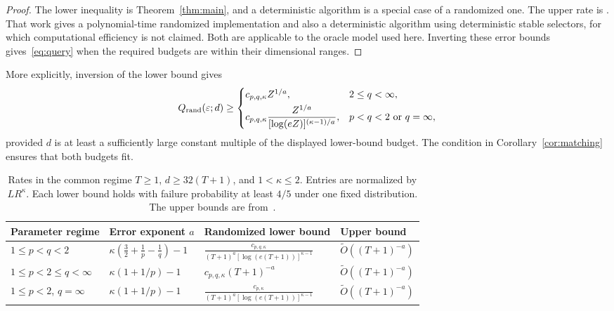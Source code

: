 \documentclass[11pt,a4paper]{article}
\theoremstyle{definition}
\theoremstyle{remark}
\newcommand{\eps}{\varepsilon}
\begin{document}
\begin{proof}
The lower inequality is Theorem~\ref{thm:main}, and a deterministic algorithm
is a special case of a randomized one. The upper rate is
\cite[Theorem 1 and the discussion on p.~3]{MBGM26}. That work gives a
polynomial-time randomized implementation and also a deterministic algorithm
using deterministic stable selectors, for which computational efficiency is
not claimed. Both are applicable to the oracle model used here.
Inverting these error bounds gives~\eqref{eq:query} when the required budgets
are within their dimensional ranges.
\end{proof}

More explicitly, inversion of the lower bound gives
\begin{equation}\label{eq:query-lower}
Q_{\rm rand}(\eps;d)\ge
\begin{cases}
 c_{p,q,\kappa}Z^{1/a},&2\le q<\infty,\\[3pt]
 \displaystyle c_{p,q,\kappa}
 \frac{Z^{1/a}}{[\log(eZ)]^{(\kappa-1)/a}},
 &p<q<2\ \text{or}\ q=\infty,
\end{cases}
\end{equation}
provided $d$ is at least a sufficiently large constant multiple of the
displayed lower-bound budget. The condition in
Corollary~\ref{cor:matching} ensures that both budgets fit.

\begin{table}[t]
\centering
\caption{Rates in the common regime $T\ge1$, $d\ge32(T+1)$, and
$1<\kappa\le2$. Entries are normalized by $LR^\kappa$.
Each lower bound holds with failure probability at least $4/5$ under one
fixed distribution. The upper bounds are from~\cite{MBGM26}.}
\label{tab:regimes}
\small
\setlength{\tabcolsep}{5pt}
\renewcommand{\arraystretch}{1.45}
\begin{tabularx}{\textwidth}{@{}P{0.21\textwidth}P{0.23\textwidth}P{0.30\textwidth}Y@{}}
\toprule
Parameter regime & Error exponent $a$ & Randomized lower bound & Upper bound\\
\midrule
$1\le p<q<2$
& $\kappa(\frac32+\frac1p-\frac1q)-1$
& $\displaystyle\frac{c_{p,q,\kappa}}{(T+1)^a[\log(e(T+1))]^{\kappa-1}}$
& $\widetilde O((T+1)^{-a})$\\
$1\le p<2\le q<\infty$
& $\kappa(1+1/p)-1$
& $c_{p,q,\kappa}(T+1)^{-a}$
& $\widetilde O((T+1)^{-a})$\\
$1\le p<2$, $q=\infty$
& $\kappa(1+1/p)-1$
& $\displaystyle\frac{c_{p,\kappa}}{(T+1)^a[\log(e(T+1))]^{\kappa-1}}$
& $\widetilde O((T+1)^{-a})$\\
\bottomrule
\end{tabularx}
\end{table}
\end{document}
